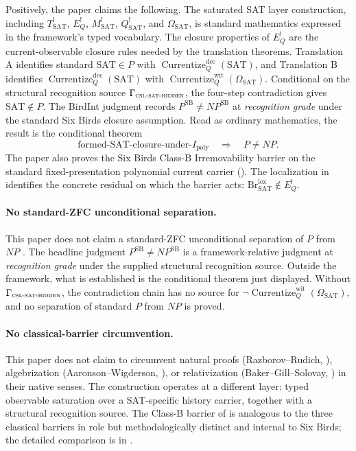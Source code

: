 \documentclass[11pt]{article}
\newcommand{\Tsat}{T^{!}_{\mathrm{SAT}}}
\newcommand{\Ipoly}{I_{\mathrm{poly}}}
\newcommand{\EQbang}{E^{!}_{Q}}
\newcommand{\Qsat}{Q^{!}_{\mathrm{SAT}}}
\newcommand{\Msat}{M^{!}_{\mathrm{SAT}}}
\newcommand{\OmegaSAT}{\Omega_{\mathrm{SAT}}}
\newcommand{\CurrentizeDec}{\operatorname{Currentize}^{\mathrm{dec}}_{Q}}
\newcommand{\CurrentizeWit}{\operatorname{Currentize}^{\mathrm{wit}}_{Q}}
\newcommand{\CSLSATHidden}{\Gamma_{\textsc{csl-sat-hidden}}}
\newcommand{\PSB}{P^{\mathrm{SB}}}
\newcommand{\NPSB}{NP^{\mathrm{SB}}}
\newcommand{\RecognitionGrade}{\emph{recognition grade}}
\theoremstyle{definition}
\begin{document}
Positively, the paper claims the following.  The saturated SAT layer
construction, including \(\Tsat\), \(\EQbang\), \(\Msat\),
\(\Qsat\), and \(\OmegaSAT\), is standard mathematics expressed in
the framework's typed vocabulary.  The closure properties of
\(\EQbang\) are the current-observable closure rules needed by the
translation theorems.  Translation A identifies standard
\(\mathrm{SAT}\in P\) with \(\CurrentizeDec(\mathrm{SAT})\), and
Translation B identifies \(\CurrentizeDec(\mathrm{SAT})\) with
\(\CurrentizeWit(\OmegaSAT)\).  Conditional on the structural
recognition source \(\CSLSATHidden\), the four-step contradiction
gives \(\mathrm{SAT}\notin P\).  The BirdInt judgment records
\(\PSB\neq\NPSB\) at \RecognitionGrade{} under the standard Six Birds
closure assumption.  Read as ordinary mathematics, the result is the
conditional theorem
\[
  \text{formed-SAT-closure-under-\(\Ipoly\)}
  \quad\Longrightarrow\quad
  P\neq NP.
\]
The paper also proves the Six Birds Class-B Irremovability barrier on
the standard fixed-presentation polynomial current carrier
().  The localization in
 identifies the concrete residual on
which the barrier acts:
\(\mathrm{Br}^{\mathrm{lex}}_{\mathrm{SAT}}\notin\EQbang\).

\paragraph{No standard-ZFC unconditional separation.}
\label{nonclaim:pvnp:standard-zfc-pneqnp}
This paper does not claim a standard-ZFC unconditional separation of
\(P\) from \(NP\) \citep{Cook2000PNPClay,Fortnow2009StatusPNP,Fortnow2022FiftyYears}.  The headline judgment \(\PSB\neq\NPSB\) is a
framework-relative judgment at \RecognitionGrade{} under the supplied
structural recognition source.  Outside the framework, what is
established is the conditional theorem just displayed.  Without
\(\CSLSATHidden\), the contradiction chain has no source for
\(\neg\CurrentizeWit(\OmegaSAT)\), and no separation of standard
\(P\) from \(NP\) is proved.

\paragraph{No classical-barrier circumvention.}
\label{nonclaim:pvnp:circumvent-classical-barriers}
This paper does not claim to circumvent natural proofs
(Razborov--Rudich, \citealp{RazborovRudich1997NaturalProofs}),
algebrization (Aaronson--Wigderson,
\citealp{AaronsonWigderson2009Algebrization}), or relativization
(Baker--Gill--Solovay, \citealp{BakerGillSolovay1975Relativization}) in
their native senses.  The construction operates at a different layer:
typed observable saturation over a SAT-specific history carrier,
together with a structural recognition source.  The Class-B barrier of
 is analogous to the three classical barriers
in role but methodologically distinct and internal to Six Birds; the
detailed comparison is in .
\end{document}
